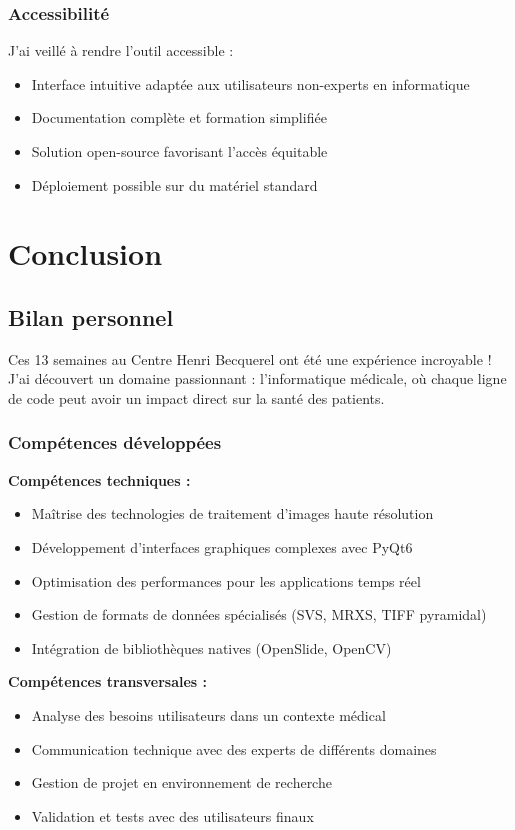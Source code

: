 \documentclass[11pt,a4paper]{report}
\begin{document}
\subsection{Accessibilité}

J'ai veillé à rendre l'outil accessible :

\begin{itemize}
\item Interface intuitive adaptée aux utilisateurs non-experts en informatique
\item Documentation complète et formation simplifiée
\item Solution open-source favorisant l'accès équitable
\item Déploiement possible sur du matériel standard
\end{itemize}

\chapter{Conclusion}

\section{Bilan personnel}

Ces 13 semaines au Centre Henri Becquerel ont été une expérience incroyable ! J'ai découvert un domaine passionnant : l'informatique médicale, où chaque ligne de code peut avoir un impact direct sur la santé des patients.

\subsection{Compétences développées}

\textbf{Compétences techniques :}
\begin{itemize}
\item Maîtrise des technologies de traitement d'images haute résolution
\item Développement d'interfaces graphiques complexes avec PyQt6
\item Optimisation des performances pour les applications temps réel
\item Gestion de formats de données spécialisés (SVS, MRXS, TIFF pyramidal)
\item Intégration de bibliothèques natives (OpenSlide, OpenCV)
\end{itemize}

\textbf{Compétences transversales :}
\begin{itemize}
\item Analyse des besoins utilisateurs dans un contexte médical
\item Communication technique avec des experts de différents domaines
\item Gestion de projet en environnement de recherche
\item Validation et tests avec des utilisateurs finaux
\end{itemize}
\end{document}

